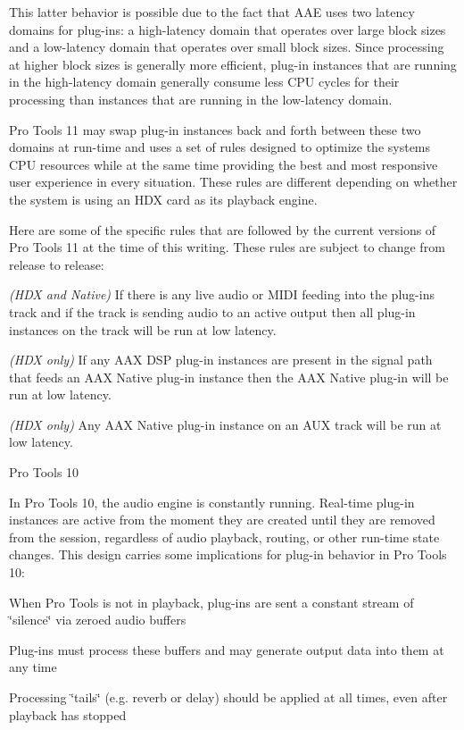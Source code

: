This latter behavior is possible due to the fact that A\+AE uses two latency domains for plug-\/ins\+: a high-\/latency domain that operates over large block sizes and a low-\/latency domain that operates over small block sizes. Since processing at higher block sizes is generally more efficient, plug-\/in instances that are running in the high-\/latency domain generally consume less C\+PU cycles for their processing than instances that are running in the low-\/latency domain.

Pro Tools 11 may swap plug-\/in instances back and forth between these two domains at run-\/time and uses a set of rules designed to optimize the system\textquotesingle{}s C\+PU resources while at the same time providing the best and most responsive user experience in every situation. These rules are different depending on whether the system is using an H\+DX card as its playback engine.

Here are some of the specific rules that are followed by the current versions of Pro Tools 11 at the time of this writing. These rules are subject to change from release to release\+:


\begin{DoxyItemize}
\item {\itshape (H\+DX and Native)} If there is any live audio or M\+I\+DI feeding into the plug-\/in\textquotesingle{}s track and if the track is sending audio to an active output then all plug-\/in instances on the track will be run at low latency. 
\item {\itshape (H\+DX only)} If any A\+AX D\+SP plug-\/in instances are present in the signal path that feeds an A\+AX Native plug-\/in instance then the A\+AX Native plug-\/in will be run at low latency. 
\item {\itshape (H\+DX only)} Any A\+AX Native plug-\/in instance on an A\+UX track will be run at low latency. 
\end{DoxyItemize}

 Pro Tools 10

In Pro Tools 10, the audio engine is constantly running. Real-\/time plug-\/in instances are active from the moment they are created until they are removed from the session, regardless of audio playback, routing, or other run-\/time state changes. This design carries some implications for plug-\/in behavior in Pro Tools 10\+:


\begin{DoxyItemize}
\item When Pro Tools is not in playback, plug-\/ins are sent a constant stream of \char`\"{}silence\char`\"{} via zeroed audio buffers  
\item Plug-\/ins must process these buffers and may generate output data into them at any time  
\item Processing \char`\"{}tails\char`\"{} (e.\+g. reverb or delay) should be applied at all times, even after playback has stopped  
\end{DoxyItemize}

